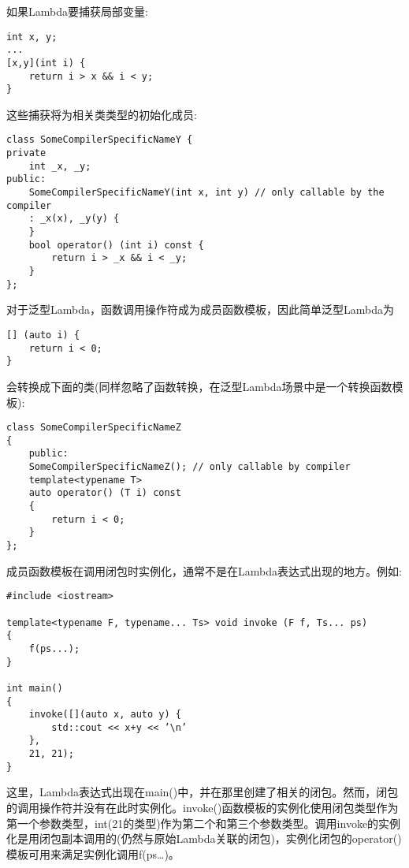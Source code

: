 如果Lambda要捕获局部变量:

\begin{lstlisting}[style=styleCXX]
int x, y;
...
[x,y](int i) {
	return i > x && i < y;
}
\end{lstlisting}

这些捕获将为相关类类型的初始化成员:

\begin{lstlisting}[style=styleCXX]
class SomeCompilerSpecificNameY {
private
	int _x, _y;
public:
	SomeCompilerSpecificNameY(int x, int y) // only callable by the compiler
	: _x(x), _y(y) {
	}
	bool operator() (int i) const {
		return i > _x && i < _y;
	}
};
\end{lstlisting}

对于泛型Lambda，函数调用操作符成为成员函数模板，因此简单泛型Lambda为

\begin{lstlisting}[style=styleCXX]
[] (auto i) {
	return i < 0;
}
\end{lstlisting}

会转换成下面的类(同样忽略了函数转换，在泛型Lambda场景中是一个转换函数模板):

\begin{lstlisting}[style=styleCXX]
class SomeCompilerSpecificNameZ
{
	public:
	SomeCompilerSpecificNameZ(); // only callable by compiler
	template<typename T>
	auto operator() (T i) const
	{
		return i < 0;
	}
};
\end{lstlisting}

成员函数模板在调用闭包时实例化，通常不是在Lambda表达式出现的地方。例如:

\begin{lstlisting}[style=styleCXX]
#include <iostream>

template<typename F, typename... Ts> void invoke (F f, Ts... ps)
{
	f(ps...);
}

int main()
{
	invoke([](auto x, auto y) {
		std::cout << x+y << ’\n’
	},
	21, 21);
}
\end{lstlisting}

这里，Lambda表达式出现在main()中，并在那里创建了相关的闭包。然而，闭包的调用操作符并没有在此时实例化。invoke()函数模板的实例化使用闭包类型作为第一个参数类型，int(21的类型)作为第二个和第三个参数类型。调用invoke的实例化是用闭包副本调用的(仍然与原始Lambda关联的闭包)，实例化闭包的operator()模板可用来满足实例化调用f(ps…)。












